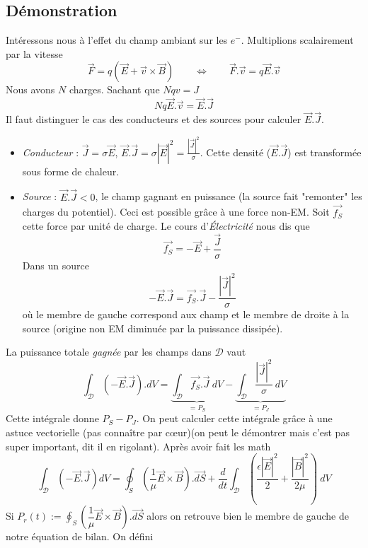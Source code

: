	\subsection{Démonstration}
	Intéressons nous à l'effet du champ ambiant sur les $e^-$. Multiplions scalairement par la vitesse
	\begin{equation}
	\vec{F} = q(\vec{E}+\vec{v}\times\vec{B})\qquad \Leftrightarrow\qquad \vec{F}.\vec{v}=q\vec{E}.
	\vec{v}
	\end{equation}
	Nous avons $N$ charges. Sachant que $Nqv = J$
	\begin{equation}
	Nq\vec{E}.\vec{v} = \vec{E}.\vec{J}
	\end{equation}
	Il faut distinguer le cas des conducteurs et des sources pour calculer $\vec{E}.\vec{J}$. 
	\begin{itemize}
	\item \textit{Conducteur} : $\vec{J}=\sigma\vec{E}$, $\vec{E}.\vec{J} = \sigma|\vec{E}|^2=
	\frac{|\vec J|^2}{\sigma}$. Cette densité ($\vec{E}.\vec{J}$) est transformée sous forme 
	de chaleur.
	\item \textit{Source} : $\vec{E}.\vec{J}<0$, le champ gagnant en puissance (la source 
	fait "remonter" les charges du potentiel). Ceci est possible grâce à une force non-EM. Soit 
	$\vec{f_S}$ cette force par unité de charge. Le cours d'\textit{Électricité} nous dis que
	\begin{equation}
	\vec{f_S} = -\vec{E}+\dfrac{\vec{J}}{\sigma}
	\end{equation}
	Dans un source
	\begin{equation}
	-\vec{E}.\vec{J} = \vec{f_S}.\vec{J}-\dfrac{|\vec{J}|^2}{\sigma}
	\end{equation}
	où le membre de gauche correspond aux champ et le membre de droite à la source (origine non EM 
	diminuée par la puissance dissipée).
	\end{itemize}		
	La puissance totale \textit{gagnée} par les champs dans $\mathcal{D}$ vaut
	\begin{equation}
	\int_\mathcal{D}(-\vec{E}.\vec{J}).dV = \underbrace{\int_\mathcal{D}\vec{f_S}.\vec{J}\ dV}_{=P_S}
	-\underbrace{\int_\mathcal{D}\dfrac{|\vec{J}|^2}{\sigma}\ dV}_{=P_J}
	\end{equation}
	Cette intégrale donne $P_S-P_J$. On peut calculer cette intégrale grâce à une astuce 
	vectorielle (pas connaître par cœur)(on peut le démontrer mais c'est pas super important, 
	dit il en rigolant). Après avoir fait les math
	\begin{equation}
	\int_\mathcal{D}(-\vec{E}.\vec{J})dV = \oint_S\left(\dfrac{1}{\mu}\vec{E}\times\vec{B}\right)
	.\vec{dS} + \dfrac{d}{dt}\int_\mathcal{D}\left(\dfrac{\epsilon|\vec{E}|^2}{2}+\dfrac{|\vec{B}|^2}
	{2\mu}\right)\ dV
	\end{equation}
	Si $P_r(t) := \oint_S\left(\dfrac{1}{\mu}\vec{E}\times\vec{B}\right).\vec{dS}$ alors on retrouve 
	bien le membre de gauche de notre équation de bilan. On défini\\
	\ 
	
